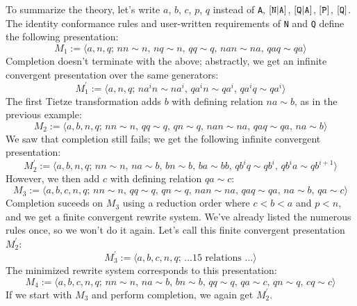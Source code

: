 \documentclass[../generics]{subfiles}
\begin{document}
\begin{example}
\smallskip

To summarize the theory, let's write $a$, $b$, $c$, $p$, $q$ instead of \texttt{A}, $[\texttt{N}|\texttt{A}]$, $[\texttt{Q}|\texttt{A}]$, $[\texttt{P}]$, $[\texttt{Q}]$. The identity conformance rules and user-written requirements of \texttt{N} and \texttt{Q} define the following presentation:
\[M_1 := \langle a,n,q;\,nn\sim n,\, nq\sim n,\, qq\sim q,\,nan\sim na,\,qaq\sim qa\rangle\]
Completion doesn't terminate with the above; abstractly, we get an infinite convergent presentation over the same generators:
\[M_1^\prime := \langle a,n,q;\,na^in\sim na^i,\, qa^in\sim qa^i,\,qa^iq\sim qa^i\rangle\]
The first Tietze transformation adds $b$ with defining relation $na\sim b$, as in the previous example:
\[M_2 := \langle a,b,n,q;\,nn\sim n,\, qq\sim q,\, qn\sim q,\, nan\sim na,\,qaq\sim qa,\,na\sim b\rangle\]
We saw that completion still fails; we get the following infinite convergent presentation:
\[M_2^{\prime} := \langle a,b,n,q;\,nn\sim n,\,na\sim b,\,bn\sim b,\,ba\sim bb,\,qb^iq\sim qb^i,\, qb^ia\sim qb^{i+1}\rangle\]
However, we then add $c$ with defining relation $qa\sim c$:
\[M_3 := \langle a,b,c,n,q;\,nn\sim n,\, qq\sim q,\, qn\sim q,\, nan\sim na,\,qaq\sim qa,\,na\sim b,\,qa\sim c\rangle\]
Completion suceeds on $M_3$ using a reduction order where $c<b<a$ and $p<n$, and we get a finite convergent rewrite system. We've already listed the numerous rules once, so we won't do it again. Let's call this finite convergent presentation $M_2^\prime$:
\[M_3^\prime := \langle a,b,c,n,q;\,\mbox{\ldots 15 relations \ldots}\rangle\]
The minimized rewrite system corresponds to this presentation:
\[M_4 :=\langle a,b,c,n,q;\,nn\sim n,\, na\sim b,\, bn\sim b,\, qq\sim q,\, qa\sim c,\, qn\sim q,\, cq\sim c\rangle\]
If we start with $M_3$ and perform completion, we again get $M_2^\prime$.
\end{example}
\end{document}
